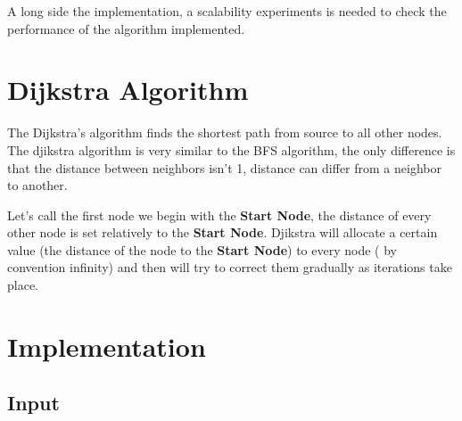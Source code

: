 \documentclass[english]{article}
\begin{document}
A long side the implementation, a scalability experiments is needed to check the performance of the algorithm implemented.

\section{Dijkstra Algorithm}
The Dijkstra’s algorithm finds the shortest path from source to all other nodes. The djikstra algorithm is very similar to the BFS algorithm, the only difference is that the distance between neighbors isn't 1, distance can differ from a neighbor to another.

Let's call the first node we begin with the \textbf{Start Node}, 
the distance of every other node is set relatively to the \textbf{Start Node}. Djikstra will allocate a certain value (the distance of the node to the \textbf{Start Node}) to every node ( by convention infinity) and then will try to correct them gradually as iterations take place.


\newpage
\section{Implementation}
\subsection{Input}
\end{document}
